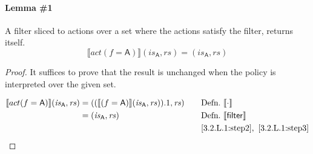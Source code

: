\documentclass[12pt, letterpaper]{article}
\newcommand\interp[1]{\llbracket #1 \rrbracket}
\begin{document}
 \paragraph{Lemma \#1}
     A filter sliced to actions over a set where the actions satisfy the filter, returns itself.
 \[
     \interp{ act(f=\mathsf{A}) } (\mathit{is}_{\mathsf{A}}, \mathit{rs}) = (\mathit{is_{\mathsf{A}}}, \mathit{rs})
 \]
 \begin{proof}
     It suffices to prove that the result is unchanged when the policy is interpreted over the given set.
     \par\nobreak
     {\fontsize{10pt}{12pt}\selectfont
     \begin{alignat}{2}
         \setcounter{equation}{0}
         \label{3.2.L.1:step2}
         \interp{ act(f=\mathsf{A}) } (\mathit{is}_{\mathsf{A}}, \mathit{rs})
         &= 
         ((\interp{ (f=\mathsf{A}) } (\mathit{is}_{\mathsf{A}}, \mathit{rs})).1, \mathit{rs})
         &&\quad \text{Defn.}\ \interp{\cdot}\\
         \label{3.2.L.1:step3}
         &=
         (\mathit{is}_{\mathsf{A}}, \mathit{rs})
         &&\quad \text{Defn.}\ \interp{\mathsf{filter}}\\
         \label{3.2.L.1:qed}
         &\qedhere
         &&\quad \ref{3.2.L.1:step2},\ \ref{3.2.L.1:step3}
     \end{alignat}
     }%
 \end{proof}
\end{document}
